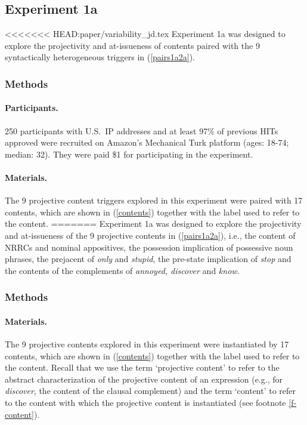 \documentclass[11pt,fleqn]{article}
\newcommand{\6}{\mbox{$[\hspace*{-.6mm}[$}}
\newcommand{\9}{\mbox{$]\hspace*{-.6mm}]$}}
\begin{document}
\subsection{Experiment 1a}\label{s-exp1a}

<<<<<<< HEAD:paper/variability_jd.tex
Experiment 1a was designed to explore the projectivity and at-issueness of contents paired with the 9 syntactically heterogeneous triggers in (\ref{pairs1a2a}).

\subsubsection{Methods}\label{s-methods-1a}

\paragraph{Participants.} 250 participants with U.S.\ IP addresses and at least 97\% of previous HITs approved were recruited on Amazon's Mechanical Turk platform (ages: 18-74; median: 32). They were paid \$1 for participating in the experiment. 

\paragraph{Materials.} The 9 projective content triggers explored in this experiment were paired with 17 contents, which are shown in (\ref{contents}) together with the label used to refer to the content.
=======
Experiment 1a was designed to explore the projectivity and at-issueness of the 9 projective contents in (\ref{pairs1a2a}), i.e., the content of NRRCs and nominal appositives, the possession implication of possessive noun phrases, the prejacent of {\em only} and {\em stupid}, the pre-state implication of {\em stop} and the contents of the complements of {\em annoyed, discover} and {\em know}.

\subsubsection{Methods}\label{s-methods-1a}

\paragraph{Materials.} The 9 projective contents explored in this experiment were instantiated by 17 contents, which are shown in (\ref{contents}) together with the label used to refer to the content. Recall that we use the term `projective content' to refer to the abstract characterization of the projective content of an expression (e.g., for {\em discover}, the content of the clausal complement) and the term `content' to refer to the content with which the projective content is instantiated (see footnote \ref{f-content}).
\end{document}
